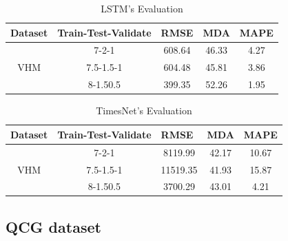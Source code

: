\documentclass{ieeeojies}
\begin{document}
\begin{table}[H]
  \begin{tabular}{|c|c|c|c|c|}
  \hline
  \multicolumn{1}{|l|}{Dataset} & \multicolumn{1}{l|}{Train-Test-Validate} & \multicolumn{1}{l|}{RMSE} & \multicolumn{1}{l|}{MDA} & \multicolumn{1}{l|}{MAPE} \\ \hline
  \multirow{3}{*}{VHM}          & 7-2-1                                    & 608.64                    & 46.33                    & 4.27                      \\ \cline{2-5} 
                                & 7.5-1.5-1                                & 604.48                    & 45.81                    & 3.86                     \\ \cline{2-5} 
                                & 8-1.50.5                                 & 399.35                    & 52.26                    & 1.95                      \\ \hline
  \end{tabular}
  \caption{LSTM's Evaluation}
    \label{vcbresult}
  \end{table}

  \begin{table}[H]
    \begin{tabular}{|c|c|c|c|c|}
    \hline
    \multicolumn{1}{|l|}{Dataset} & \multicolumn{1}{l|}{Train-Test-Validate} & \multicolumn{1}{l|}{RMSE} & \multicolumn{1}{l|}{MDA} & \multicolumn{1}{l|}{MAPE} \\ \hline
    \multirow{3}{*}{VHM}          & 7-2-1                                    & 8119.99                    & 42.17                    & 10.67                      \\ \cline{2-5} 
                                  & 7.5-1.5-1                                & 11519.35                   & 41.93                    & 15.87                      \\ \cline{2-5} 
                                  & 8-1.50.5                                 & 3700.29                    & 43.01                    & 4.21                      \\ \hline
    \end{tabular}
    \caption{TimesNet's Evaluation}
      \label{vcbresult}
    \end{table}

\subsection{QCG dataset} 
\end{document}

